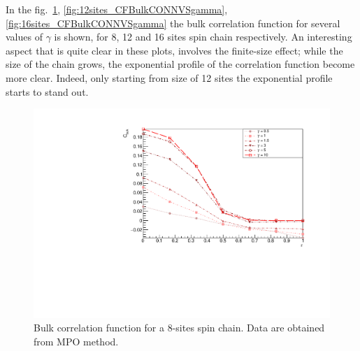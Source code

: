 
In the fig.~\ref{fig:8sites_CBulkConnVSgamma}, \ref{fig:12sites_CFBulkCONNVSgamma}, \ref{fig:16sites_CFBulkCONNVSgamma} the bulk correlation function for several values of $\gamma$ is shown, for 8, 12 and 16 sites spin chain respectively. An interesting aspect that is quite clear in these plots, involves the finite-size effect; while the size of the chain grows, the exponential profile of the correlation function become more clear. Indeed, only starting from size of 12 sites the exponential profile starts to stand out. 

\begin{figure}[H]
    \centering
    \includegraphics[scale=0.7]{Figures/8sites_CBulkConnVSgamma.pdf}
    \captionsetup{width=1.\linewidth}
    \caption{Bulk correlation function for a 8-sites spin chain. Data are obtained from MPO method.}
    \label{fig:8sites_CBulkConnVSgamma}
\end{figure}

